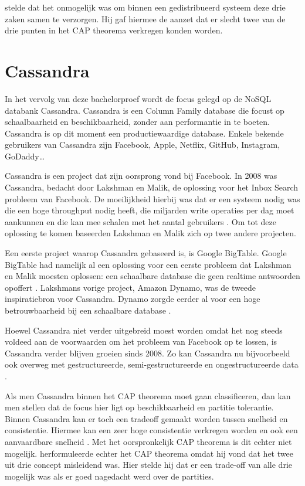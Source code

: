 \cite{brewer2000towards} stelde dat het onmogelijk was om binnen een gedistribueerd systeem deze drie zaken samen te verzorgen.
Hij gaf hiermee de aanzet dat er slecht twee van de drie punten in het CAP theorema verkregen konden worden.

\section{Cassandra}

In het vervolg van deze bachelorproef wordt de focus gelegd op de NoSQL databank Cassandra.
Cassandra is een Column Family database die focust op schaalbaarheid en beschikbaarheid, zonder aan performantie in te boeten.
Cassandra is op dit moment een productiewaardige database.
Enkele bekende gebruikers van Cassandra zijn Facebook, Apple, Netflix, GitHub, Instagram, GoDaddy\dots

Cassandra is een project dat zijn oorsprong vond bij Facebook.
In 2008 was Cassandra, bedacht door Lakshman en Malik, de oplossing voor het Inbox Search probleem van Facebook.
De moeilijkheid hierbij was dat er een systeem nodig was die een hoge throughput nodig heeft, die miljarden write operaties per dag moet aankunnen en die kan mee schalen met het aantal gebruikers \citep{lakshman2010cassandra}.
Om tot deze oplossing te komen baseerden Lakshman en Malik zich op twee andere projecten.

Een eerste project waarop Cassandra gebaseerd is, is Google BigTable.
Google BigTable had namelijk al een oplossing voor een eerste probleem dat Lakshman en Malik moesten oplossen: een schaalbare database die geen realtime antwoorden opoffert \citep{chang2008bigtable}.
Lakshmans vorige project, Amazon Dynamo, was de tweede inspiratiebron voor Cassandra.
Dynamo zorgde eerder al voor een hoge betrouwbaarheid bij een schaalbare database \citep{decandia2007dynamo}.

Hoewel Cassandra niet verder uitgebreid moest worden omdat het nog steeds voldeed aan de voorwaarden om het probleem van Facebook op te lossen, is Cassandra verder blijven groeien sinds 2008.
Zo kan Cassandra nu bijvoorbeeld ook overweg met gestructureerde, semi-gestructureerde en ongestructureerde data \citep{kan2014cassandra}.

Als men Cassandra binnen het CAP theorema moet gaan classificeren, dan kan men stellen dat de focus hier ligt op beschikbaarheid en partitie tolerantie.
Binnen Cassandra kan er toch een tradeoff gemaakt worden tussen snelheid en consistentie.
Hiermee kan een zeer hoge consistentie verkregen worden en ook een aanvaardbare snelheid \citep{ellis2009cassandra}.
Met het oorspronkelijk CAP theorema is dit echter niet mogelijk.
\cite{brewer2012cap} herformuleerde echter het CAP theorema omdat hij vond dat het twee uit drie concept misleidend was.
Hier stelde hij dat er een trade-off van alle drie mogelijk was als er goed nagedacht werd over de partities.

